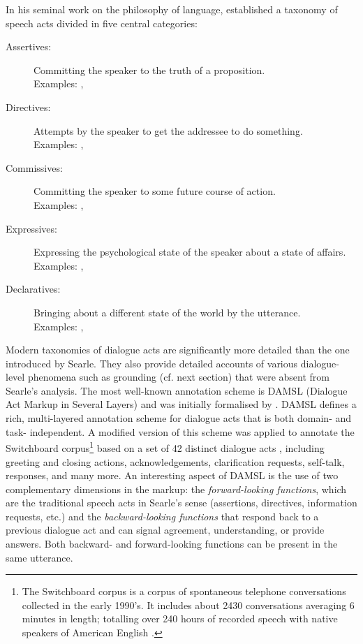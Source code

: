 In his seminal work on the philosophy of language, \cite{Searle1979} established a taxonomy of speech acts divided in five central categories:
\begin{description}
\item[Assertives: ] Committing the speaker to the truth of a proposition. \\
Examples: , 
\item[Directives: ]  Attempts by the speaker to get the addressee to do something. \\ Examples:  , 
\item[Commissives: ] Committing the speaker to some future course of action. \\ Examples: , 
\item[Expressives: ] Expressing the psychological state of the speaker about a state of affairs. \\ Examples: , 
\item[Declaratives: ] Bringing about a different state of the world by the utterance. \\ Examples: , 
\end{description}

Modern taxonomies of dialogue acts are significantly more detailed than the one introduced by Searle.  They also provide detailed accounts of various dialogue-level phenomena such as grounding (cf. next section) that were absent from Searle's analysis. The most well-known annotation scheme is DAMSL (Dialogue Act Markup in Several Layers) and was initially formalised by \cite{Core1997}.  DAMSL defines a rich, multi-layered annotation scheme for dialogue acts that is both domain- and task- independent.  A modified version of this scheme was applied to annotate the Switchboard corpus\footnote{The Switchboard corpus is a corpus of spontaneous telephone conversations collected in the early 1990's.  It includes about 2430 conversations averaging 6 minutes in length; totalling over 240 hours of recorded speech with native speakers of American English \citep{Godfrey1992}.} based on a set of 42 distinct dialogue acts \citep{Jurafsky1997}, including greeting and closing actions, acknowledgements, clarification requests, self-talk, responses, and many more.  An interesting aspect of DAMSL is the use of two complementary dimensions in the markup: the \textit{forward-looking functions}, which are the traditional speech acts in Searle's sense (assertions, directives, information requests, etc.) and the \textit{backward-looking functions} that respond back to a previous dialogue act and can signal agreement, understanding, or provide answers.  Both backward- and forward-looking functions can be present in the same utterance. 

